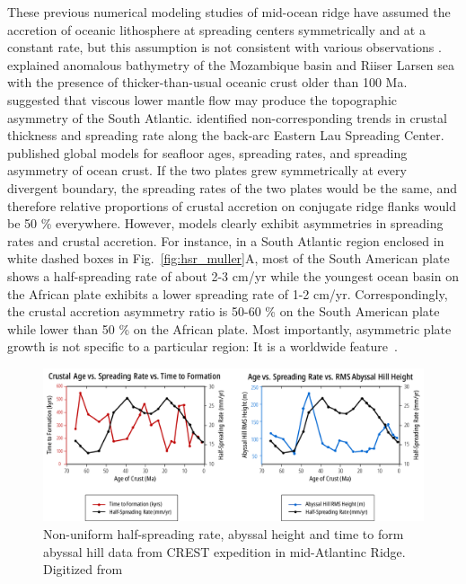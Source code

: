 \documentclass[letterpaper,12pt,notitle]{memphisthesis}                     %
\begin{document}
These previous numerical modeling studies of mid-ocean ridge have assumed the accretion of oceanic lithosphere at spreading centers symmetrically and at a constant rate, but this assumption is not consistent with various observations \citep{Castelino2016, Flament2014, Martinez2006, Muller1998, Muller2008, Fedotova2017}. \citet{Castelino2016} explained anomalous bathymetry of the Mozambique basin and Riiser Larsen sea with the presence of thicker-than-usual oceanic crust older than 100 Ma. \citet{Flament2014} suggested that viscous lower mantle flow may produce the topographic asymmetry of the South Atlantic. \citet{Martinez2006} identified non-corresponding trends in crustal thickness and spreading rate along the back-arc Eastern Lau Spreading Center. \citet{Muller2008} published global models for seafloor ages, spreading rates, and spreading asymmetry of ocean crust. If the two plates grew symmetrically at every divergent boundary, the spreading rates of the two plates would be the same, and therefore relative proportions of crustal accretion on conjugate ridge flanks would be 50 \% everywhere. However, \citet{Muller2008} models clearly exhibit asymmetries in spreading rates and crustal accretion. For instance, in a South Atlantic region enclosed in white dashed boxes in Fig.~\ref{fig:hsr_muller}A, most of the South American plate shows a half-spreading rate of about 2-3 cm/yr while the youngest ocean basin on the African plate exhibits a lower spreading rate of 1-2 cm/yr. Correspondingly, the crustal accretion asymmetry ratio is 50-60 \% on the South American plate while lower than 50 \% on the African plate. Most importantly, asymmetric plate growth is not specific to a particular region: It is a worldwide feature~\citep{Muller2008}.
%
\begin{figure}[!htb]
	\centering
	\includegraphics[width=0.99\linewidth]{./figs/hsrgraph1.pdf}
	\caption{Non-uniform half-spreading rate, abyssal height and time to form abyssal hill data from CREST expedition in mid-Atlantinc Ridge. Digitized from \citet{Fedotova2017}}
	\label{fig:hsr_fedotova}
\end{figure}
\end{document}
